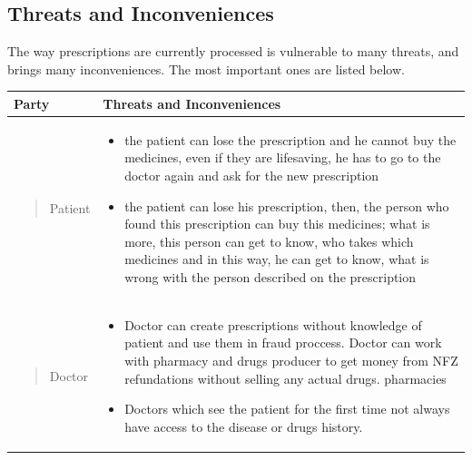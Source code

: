 \subsection{Threats and Inconveniences}
The way prescriptions are currently processed is vulnerable to many threats, and brings many inconveniences. The most important ones are listed below.

\begin{longtable}{|p{3cm}|p{9cm}|}
    
    \hline
    \centering Party & Threats and Inconveniences \\ \hline
    \vspace*{\fill} \begin{quote} \centering Patient \end{quote} \vspace*{\fill} & \begin{itemize}
    \item the patient can lose the prescription and he cannot
    buy the medicines, even if they are lifesaving,
    he has to go to the doctor again and ask
    for the new prescription \newline
    \item the patient can lose his prescription, then, the
    person who found this prescription can buy this
    medicines; what is more, this person can get to
    know, who takes which medicines and in this
    way, he can get to know, what is wrong with
    the person described on the prescription
    
    \end{itemize}
    \\ \hline
  
    \hline
    \vspace*{\fill} \begin{quote} \centering Doctor  \end{quote} \vspace*{\fill} & \begin{itemize}
    \item Doctor can create prescriptions without knowledge of patient and use them in fraud proccess.
    Doctor can work with pharmacy and drugs producer to get money from NFZ refundations without selling any actual drugs.
    pharmacies \newline
    \item Doctors which see the patient for the first time not always have access to the disease or drugs history.

    \end{itemize}
    \\ \hline


\end{longtable}
